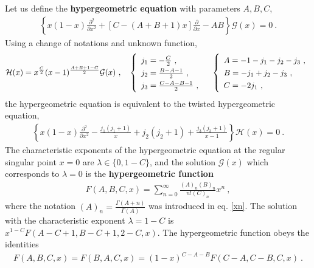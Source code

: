 \documentclass[12pt,a4paper,notitlepage]{report}
\numberwithin{equation}{section}
\theoremstyle{break}
\begin{document}
 Let us define the \textbf{\boldmath hypergeometric equation} with parameters $A,B,C$, 
\begin{align}
 \left\{ x(1-x) \frac{\partial^2}{\partial x^2} +\left[C-(A+B+1)x\right]{\frac{\partial}{\partial x}} - AB \right\} \mathcal{G}(x)= 0\ .
\label{dzp}
\end{align}
Using a change of notations and unknown function,
\begin{align}
 \mathcal{H}(x)= x^{\frac{C}{2}} (x-1)^{\frac{A+B+1-C}{2}}\mathcal{G}(x)\ , \quad \renewcommand{\arraystretch}{1.3}\left\{\begin{array}{l}  j_1 = -\frac{C}{2} \ , \\ j_2=\frac{B-A-1}{2} \ , \\  j_3= \frac{C-A-B-1}{2}\ , \end{array}\right.    
\quad \left\{\begin{array}{l}  A = -1-j_1-j_2-j_3\ , \\ B = -j_1+j_2-j_3\ , \\ C = -2j_1\ , \end{array}\right. 
\end{align}
the hypergeometric equation is equivalent to the twisted hypergeometric equation,
\begin{align}
 \left\{ x(1-x) \frac{\partial^2}{\partial x^2}  -\frac{j_1(j_1+1)}{x}+ j_2(j_2+1)+\frac{j_3(j_3+1)}{x-1}\right\} \mathcal{H}(x) = 0\ .
\label{hj}
\end{align}
The characteristic exponents of the hypergeometric equation at the regular singular point $x=0$ are $\lambda\in \{0,1-C\}$, and the solution $\mathcal{G}(x)$ which corresponds to $\lambda=0$
 is the \textbf{\boldmath hypergeometric function}
\begin{align}
 F(A,B,C,x) = \sum_{n=0}^\infty \frac{(A)_n(B)_n}{n!(C)_n}x^n\ ,
\label{fsn}
\end{align}
where the notation $(A)_n = \frac{\Gamma(A+n)}{\Gamma(A)}$ was introduced in eq. \eqref{xn}.
The solution with the characteristic exponent $\lambda=1-C$ is $x^{1-C}F(A-C+1,B-C+1,2-C,x)$.
The hypergeometric function obeys the identities 
\begin{align}
 F(A,B,C,x) = F(B,A,C,x) = (1-x)^{C-A-B} F(C-A,C-B,C,x)\ .
\label{fff}
\end{align}
\end{document}
